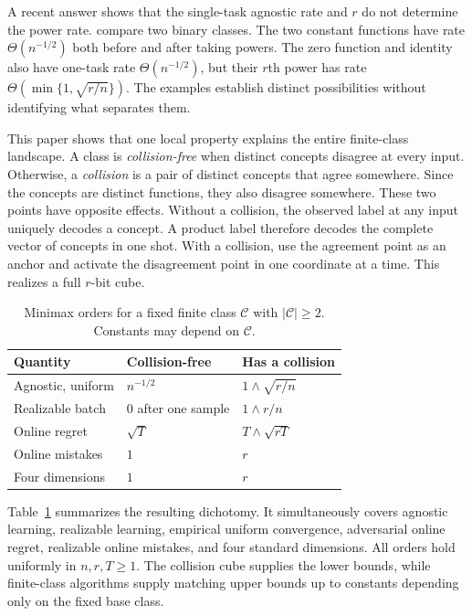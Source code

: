 \documentclass[twoside]{article}
\newcommand{\C}{\mathcal C}
\begin{document}
A recent answer shows that the single-task agnostic rate and $r$ do not determine the power rate. \citet{more2026} compare two binary classes. The two constant functions have rate $\Theta(n^{-1/2})$ both before and after taking powers. The zero function and identity also have one-task rate $\Theta(n^{-1/2})$, but their $r$th power has rate $\Theta(\min\{1,\sqrt{r/n}\})$. The examples establish distinct possibilities without identifying what separates them.

This paper shows that one local property explains the entire finite-class landscape. A class is \emph{collision-free} when distinct concepts disagree at every input. Otherwise, a \emph{collision} is a pair of distinct concepts that agree somewhere. Since the concepts are distinct functions, they also disagree somewhere. These two points have opposite effects. Without a collision, the observed label at any input uniquely decodes a concept. A product label therefore decodes the complete vector of concepts in one shot. With a collision, use the agreement point as an anchor and activate the disagreement point in one coordinate at a time. This realizes a full $r$-bit cube.

\begin{table}[t]
\caption{Minimax orders for a fixed finite class $\C$ with $|\C|\geq2$. Constants may depend on $\C$.}
\label{tab:dichotomy}
\centering
\small \setlength{\tabcolsep}{3.2pt}
\begin{tabular}{p{}p{}p{}}
\toprule
Quantity & Collision-free & Has a collision \\
\midrule
Agnostic, uniform & $n^{-1/2}$ & $1\wedge\sqrt{r/n}$ \\
Realizable batch & $0$ after one sample & $1\wedge r/n$ \\
Online regret & $\sqrt T$ & $T\wedge\sqrt{rT}$ \\
Online mistakes & $1$ & $r$ \\
Four dimensions & $1$ & $r$ \\
\bottomrule
\end{tabular}
\end{table}

Table~\ref{tab:dichotomy} summarizes the resulting dichotomy. It simultaneously covers agnostic learning, realizable learning, empirical uniform convergence, adversarial online regret, realizable online mistakes, and four standard dimensions. All orders hold uniformly in $n,r,T\geq1$. The collision cube supplies the lower bounds, while finite-class algorithms supply matching upper bounds up to constants depending only on the fixed base class.
\end{document}
